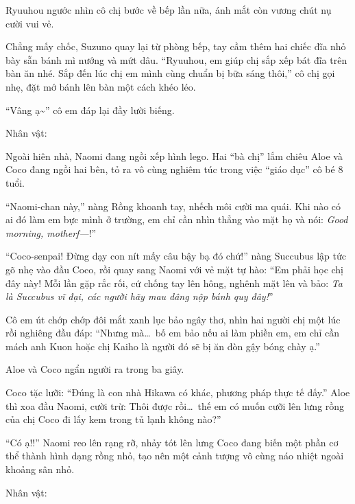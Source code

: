 \documentclass[../main.tex]{subfiles}
\begin{document}
Ryuuhou ngước nhìn cô chị bước về bếp lần nữa, ánh mắt còn vương chút nụ cười vui vẻ.

Chẳng mấy chốc, Suzuno quay lại từ phòng bếp, tay cầm thêm hai chiếc đĩa nhỏ bày sẵn bánh mì nướng và mứt dâu. ``Ryuuhou, em giúp chị sắp xếp bát đĩa trên bàn ăn nhé. Sắp đến lúc chị em mình cùng chuẩn bị bữa sáng thôi,'' cô chị gọi nhẹ, đặt mớ bánh lên bàn một cách khéo léo.

``Vâng ạ\~{}'' cô em đáp lại đầy lười biếng.

\newpage

\begin{center}
{\caviar\fontsize{12pt}{12pt}\selectfont Nhân vật:   }
\end{center}

Ngoài hiên nhà, Naomi đang ngồi xếp hình lego. Hai ``bà chị'' lắm chiêu Aloe và Coco đang ngồi hai bên, tỏ ra vô cùng nghiêm túc trong việc ``giáo dục'' cô bé 8 tuổi.

``Naomi-chan này,'' nàng Rồng khoanh tay, nhếch môi cười ma quái. Khi nào có ai đó làm em bực mình ở trường, em chỉ cần nhìn thẳng vào mặt họ và nói: \textit{Good morning, motherf---}!''

``Coco-senpai! Đừng dạy con nít mấy câu bậy bạ đó chứ!'' nàng Succubus lập tức gõ nhẹ vào đầu Coco, rồi quay sang Naomi với vẻ mặt tự hào: ``Em phải học chị đây này! Mỗi lần gặp rắc rối, cứ chống tay lên hông, nghênh mặt lên và bảo: \textit{Ta là Succubus vĩ đại, các người hãy mau dâng nộp bánh quy đây!}''

Cô em út chớp chớp đôi mắt xanh lục bảo ngây thơ, nhìn hai người chị một lúc rồi nghiêng đầu đáp: ``Nhưng mà\dots\ bố em bảo nếu ai làm phiền em, em chỉ cần mách anh Kuon hoặc chị Kaiho là người đó sẽ bị ăn đòn gậy bóng chày ạ.''

Aloe và Coco ngẩn người ra trong ba giây.

Coco tặc lưỡi: ``Đúng là con nhà Hikawa có khác, phương pháp thực tế đấy.'' Aloe thì xoa đầu Naomi, cười trừ: Thôi được rồi\dots\ thế em có muốn cưỡi lên lưng rồng của chị Coco đi lấy kem trong tủ lạnh không nào?''

``Có ạ!!'' Naomi reo lên rạng rỡ, nhảy tót lên lưng Coco đang biến một phần cơ thể thành hình dạng rồng nhỏ, tạo nên một cảnh tượng vô cùng náo nhiệt ngoài khoảng sân nhỏ.

\newpage

\begin{center}
{\caviar\fontsize{12pt}{12pt}\selectfont Nhân vật:  }
\end{center}
\end{document}
